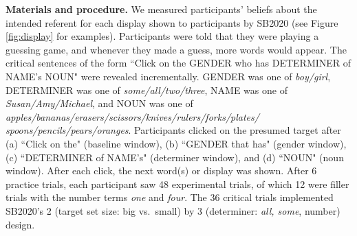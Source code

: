 \documentclass[10pt,letterpaper]{article}
\newcommand{\figref}[1]{Figure \ref{#1}}
\begin{document}
\textbf{Materials and procedure.} We measured participants' beliefs about the intended referent for each display shown to participants by SB2020 (see \figref{fig:display} for examples). Participants were told that they were playing a guessing game, and whenever they made a guess, more words would appear. The critical sentences of the form ``Click on the GENDER who has DETERMINER  of NAME's NOUN" were revealed incrementally. GENDER was one of \emph{boy/girl}, DETERMINER was one of \emph{some/all/two/three}, NAME was one of \emph{Susan/Amy/Michael}, and NOUN was one of \emph{apples/bananas/erasers/scissors/knives/rulers/forks/plates/
spoons/pencils/pears/oranges}.  Participants clicked on the presumed target after (a) ``Click on the" (baseline window), (b) ``GENDER that has" (gender window), (c) ``DETERMINER of NAME's" (determiner window), and (d) ``NOUN" (noun window). After each click, the next word(s) or display was shown. After 6 practice trials, each participant saw 48 experimental trials, of which 12 were filler trials with the number terms \emph{one} and \emph{four}. The 36 critical trials implemented SB2020's 2 (target set size: big vs.~small) by 3 (determiner: \emph{all, some}, number) design. 
\end{document}
